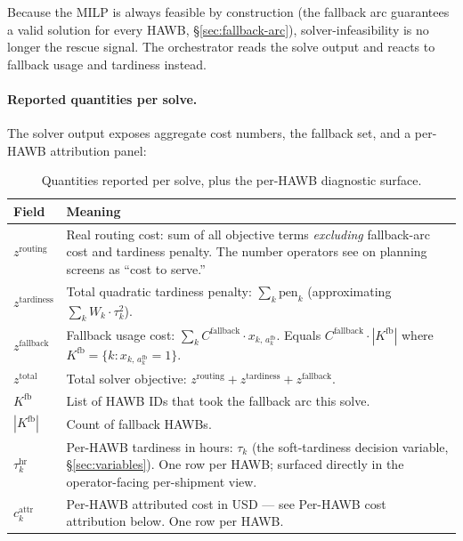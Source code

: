 \documentclass[11pt,a4paper]{article}
\theoremstyle{definition}
\begin{document}
Because the MILP is always feasible by construction (the fallback arc
guarantees a valid solution for every HAWB, \S\ref{sec:fallback-arc}),
solver-infeasibility is no longer the rescue signal. The orchestrator reads
the solve output and reacts to fallback usage and tardiness instead.

\paragraph{Reported quantities per solve.}
The solver output exposes aggregate cost numbers, the fallback set, and a
per-HAWB attribution panel:
\begin{table}[H]
\centering
\caption{Quantities reported per solve, plus the per-HAWB diagnostic surface.}
\label{tab:output-quantities}
\begin{tabular}{lp{9.0cm}}
\toprule
Field & Meaning \\
\midrule
$z^{\text{routing}}$ & Real routing cost: sum of all objective terms
\emph{excluding} fallback-arc cost and tardiness penalty. The number
operators see on planning screens as ``cost to serve.'' \\
$z^{\text{tardiness}}$ & Total quadratic tardiness penalty: $\sum_k \text{pen}_k$
(approximating $\sum_k W_k \cdot \tau_k^2$). \\
$z^{\text{fallback}}$ & Fallback usage cost: $\sum_k C^{\text{fallback}}
\cdot x_{k,\, a^{\text{fb}}_k}$. Equals $C^{\text{fallback}} \cdot
|K^{\text{fb}}|$ where $K^{\text{fb}} = \{k : x_{k,\, a^{\text{fb}}_k} = 1\}$. \\
$z^{\text{total}}$ & Total solver objective: $z^{\text{routing}} + z^{\text{tardiness}} + z^{\text{fallback}}$. \\
$K^{\text{fb}}$ & List of HAWB IDs that took the fallback arc this solve. \\
$|K^{\text{fb}}|$ & Count of fallback HAWBs. \\
$\tau_k^{\text{hr}}$ & Per-HAWB tardiness in hours: $\tau_k$ (the soft-tardiness decision variable, \S\ref{sec:variables}). One row per HAWB; surfaced directly in the operator-facing per-shipment view. \\
$c_k^{\text{attr}}$ & Per-HAWB attributed cost in USD --- see Per-HAWB cost attribution below. One row per HAWB. \\
\bottomrule
\end{tabular}
\end{table}
\end{document}
